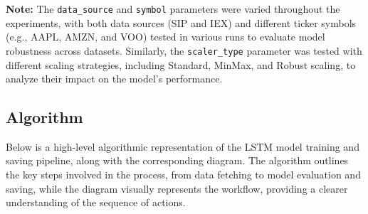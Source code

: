 \documentclass[letterpaper]{article}
\begin{document}
\textbf{Note:} The \texttt{data\_source} and \texttt{symbol} parameters were varied throughout the experiments, with both data sources (SIP and IEX) and different ticker symbols (e.g., AAPL, AMZN, and VOO) tested in various runs to evaluate model robustness across datasets. Similarly, the \texttt{scaler\_type} parameter was tested with different scaling strategies, including Standard, MinMax, and Robust scaling, to analyze their impact on the model's performance.


\subsection{Algorithm}\label{subsec:lstm_pipeline}

Below is a high-level algorithmic representation of the LSTM model training and saving pipeline, along with the corresponding diagram. The algorithm outlines the key steps involved in the process, from data fetching to model evaluation and saving, while the diagram visually represents the workflow, providing a clearer understanding of the sequence of actions.
\end{document}
